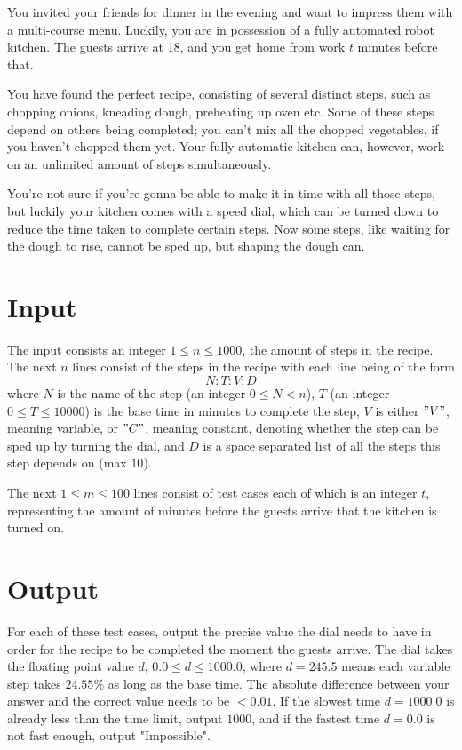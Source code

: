 

You invited your friends for dinner in the evening and want to impress them with a multi-course menu. Luckily, you are in possession of a fully automated robot kitchen. The guests arrive at 18, and you get home from work $t$ minutes before that. 

You have found the perfect recipe, consisting of several distinct steps, such as chopping onions, kneading dough, preheating up oven etc. Some of these steps depend on others being completed; you can't mix all the chopped vegetables, if you haven't chopped them yet. Your fully automatic kitchen can, however, work on an unlimited amount of steps simultaneously.

You're not sure if you're gonna be able to make it in time with all those steps, but luckily your kitchen comes with a speed dial, which can be turned down to reduce the time taken to complete certain steps. Now some steps, like waiting for the dough to rise, cannot be sped up, but shaping the dough can.


\section*{Input}

The input consists an integer $1 \leq n \leq 1000$, the amount of steps in the recipe. The next $n$ lines consist of the steps in the recipe with each line being of the form 
$$
N:T:V:D
$$
where $N$ is the name of the step (an integer $0 \leq N < n$), $T$ (an integer $0 \leq T \leq 10000$) is the base time in minutes to complete the step, $V$ is either $"V"$, meaning variable, or $"C"$, meaning constant, denoting whether the step can be sped up by turning the dial, and $D$ is a space separated list of all the steps this step depends on (max $10$).

The next $1 \leq m \leq 100$ lines consist of test cases each of which is an integer $t$, representing the amount of minutes before the guests arrive that the kitchen is turned on. 


\section*{Output}

For each of these test cases, output the precise value the dial needs to have in order for the recipe to be completed the moment the guests arrive. The dial takes the floating point value $d$, $0.0 \leq d \leq 1000.0$, where $d=245.5$ means each variable step takes $24.55\%$ as long as the base time. The absolute difference between your answer and the correct value needs to be $<0.01$. If the slowest time $d = 1000.0$ is already less than the time limit, output $1000$, and if the fastest time $d = 0.0$ is not fast enough, output "Impossible". 